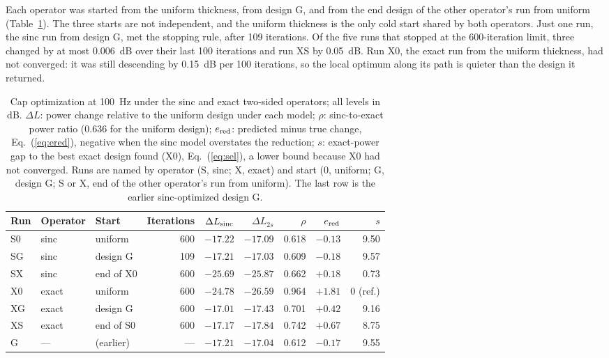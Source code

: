 \documentclass[preprint,12pt]{elsarticle}
\begin{document}
Each operator was started from the uniform thickness, from design G, and from the end design of the other operator's run from uniform (Table~\ref{tab:opt}). The three starts are not independent, and the uniform thickness is the only cold start shared by both operators. Just one run, the sinc run from design G, met the stopping rule, after 109 iterations. Of the five runs that stopped at the 600-iteration limit, three changed by at most 0.006~dB over their last 100 iterations and run XS by 0.05~dB. %
Run X0, the exact run from the uniform thickness, had not converged: it was still descending by 0.15~dB per 100 iterations, so the local optimum along its path is quieter than the design it returned. %

\begin{table}[t]
\centering
\caption{Cap optimization at 100~Hz under the sinc and exact two-sided operators; all levels in dB. $\Delta L$: power change relative to the uniform design under each model; $\rho$: sinc-to-exact power ratio (0.636 for the uniform design); $e_{\rm red}$: predicted minus true change, Eq.~(\ref{eq:ered}), negative when the sinc model overstates the reduction; $s$: exact-power gap to the best exact design found (X0), Eq.~(\ref{eq:sel}), a lower bound because X0 had not converged. Runs are named by operator (S, sinc; X, exact) and start (0, uniform; G, design G; S or X, end of the other operator's run from uniform). The last row is the earlier sinc-optimized design G.}
\label{tab:opt}
\small
\setlength{\tabcolsep}{4pt}
\begin{tabular}{lllrrrrrr}
\toprule
Run & Operator & Start & Iterations & $\Delta L_{\rm sinc}$ & $\Delta L_{2s}$ & $\rho$ & $e_{\rm red}$ & $s$ \\
\midrule
S0 & sinc  & uniform       & 600 & $-17.22$ & $-17.09$ & 0.618 & $-0.13$ & 9.50 \\
SG & sinc  & design G      & 109 & $-17.21$ & $-17.03$ & 0.609 & $-0.18$ & 9.57 \\
SX & sinc  & end of X0     & 600 & $-25.69$ & $-25.87$ & 0.662 & $+0.18$ & 0.73 \\
X0 & exact & uniform       & 600 & $-24.78$ & $-26.59$ & 0.964 & $+1.81$ & 0 (ref.) \\
XG & exact & design G      & 600 & $-17.01$ & $-17.43$ & 0.701 & $+0.42$ & 9.16 \\
XS & exact & end of S0     & 600 & $-17.17$ & $-17.84$ & 0.742 & $+0.67$ & 8.75 \\
\midrule
G  & ---   & (earlier)     & --- & $-17.21$ & $-17.04$ & 0.612 & $-0.17$ & 9.55 \\
\bottomrule
\end{tabular}
\end{table}
\end{document}
